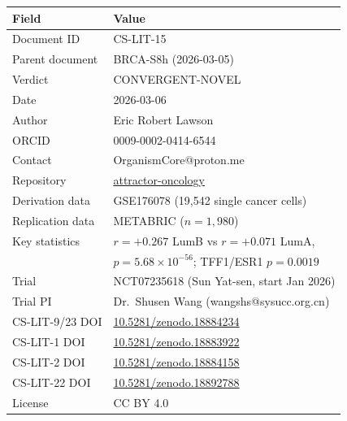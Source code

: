 \documentclass[12pt, a4paper]{article}
\begin{document}
\begin{tabular}{ll}
\toprule
\textbf{Field} & \textbf{Value} \\
\midrule
Document ID & CS-LIT-15 \\
Parent document & BRCA-S8h (2026-03-05) \\
Verdict & CONVERGENT-NOVEL \\
Date & 2026-03-06 \\
Author & Eric Robert Lawson \\
ORCID & 0009-0002-0414-6544 \\
Contact & OrganismCore@proton.me \\
Repository &
\href{https://github.com/Eric-Robert-Lawson/attractor-oncology}
{attractor-oncology} \\
Derivation data &
GSE176078 (19,542 single cancer cells) \\
Replication data &
METABRIC ($n=1{,}980$) \\
Key statistics &
$r=+0.267$ LumB vs $r=+0.071$ LumA, \\
& $p=5.68\times10^{-56}$;
TFF1/ESR1 $p=0.0019$ \\
Trial &
NCT07235618 (Sun Yat-sen, start Jan 2026) \\
Trial PI &
Dr.\ Shusen Wang
(wangshs@sysucc.org.cn) \\
CS-LIT-9/23 DOI &
\href{https://doi.org/10.5281/zenodo.18884234}
{10.5281/zenodo.18884234} \\
CS-LIT-1 DOI &
\href{https://doi.org/10.5281/zenodo.18883922}
{10.5281/zenodo.18883922} \\
CS-LIT-2 DOI &
\href{https://doi.org/10.5281/zenodo.18884158}
{10.5281/zenodo.18884158} \\
CS-LIT-22 DOI &
\href{https://doi.org/10.5281/zenodo.18892788}
{10.5281/zenodo.18892788} \\
License & CC BY 4.0 \\
\bottomrule
\end{tabular}
\end{document}
